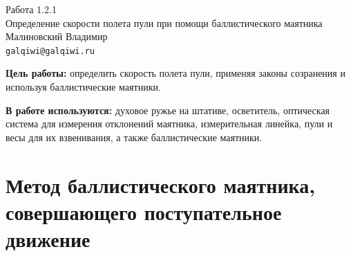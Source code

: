 



\begin{center}
  \LARGE{Работа 1.2.1}\\[0.2cm]
  \LARGE{Определение скорости полета пули при помощи баллистического маятника}\\[0.2cm]
  \large{Малиновский Владимир}\\[0.2cm]
  \normalsize{\texttt{galqiwi@galqiwi.ru}}
\end{center}

\textbf{Цель работы:} определить скорость полета пули, применяя законы созранения и используя баллистические маятники.

\textbf{В работе используются:} духовое ружье на штативе, осветитель, оптическая система для измерения отклонений маятника, измерительная линейка, пули и весы для их взвенивания, а также баллистические маятники.

\section{Метод баллистического маятника, совершающего поступательное движение}

